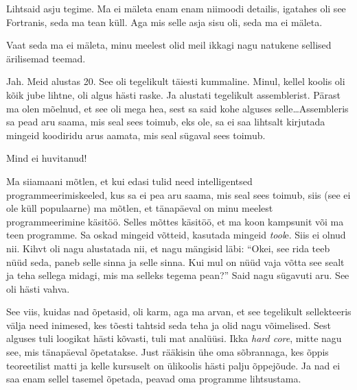 Lihtsaid asju tegime. Ma ei mäleta enam enam niimoodi detailis, igatahes oli see Fortranis, seda ma tean küll. Aga mis selle asja sisu oli, seda ma ei mäleta. 


Vaat seda ma ei mäleta, minu meelest olid meil ikkagi nagu natukene sellised ärilisemad teemad. 


Jah. Meid alustas 20. See oli tegelikult täiesti kummaline. Minul, kellel koolis oli kõik jube lihtne, oli algus hästi raske. Ja alustati tegelikult assemblerist. Pärast ma olen mõelnud, et see oli mega hea, sest sa said kohe alguses selle\ldots Assembleris  sa pead aru saama, mis seal sees toimub, eks ole, sa ei saa lihtsalt kirjutada mingeid koodiridu arus aamata, mis seal sügaval sees toimub. 


Mind ei huvitanud!


Ma siiamaani mõtlen, et kui edasi tulid need intelligentsed programmeerimiskeeled, kus sa ei pea  aru saama, mis seal sees toimub, siis (see ei ole küll populaarne) ma mõtlen, et tänapäeval on minu meelest programmeerimine käsitöö. Selles mõttes käsitöö, et ma koon kampsunit või ma teen programme. Sa oskad mingeid võtteid,  kasutada mingeid \emph{tool}e. Siis ei olnud nii. Kihvt oli nagu alustatada nii, et nagu mängisid läbi: \enquote{Okei, see rida teeb nüüd seda, paneb selle sinna ja selle sinna. Kui mul on nüüd vaja võtta see sealt ja teha sellega midagi, mis ma selleks tegema pean?} Said nagu sügavuti aru. See oli hästi vahva. 

See viis, kuidas nad õpetasid, oli karm, aga ma arvan, et see tegelikult sellekteeris välja need inimesed, kes tõesti tahtsid seda teha ja olid nagu võimelised. Sest  alguses tuli loogikat hästi kõvasti, tuli mat analüüsi. Ikka \emph{hard core}, mitte nagu see, mis tänapäeval õpetatakse. Just rääkisin ühe oma sõbrannaga, kes õppis teoreetilist matti ja kelle kursuselt on ülikoolis hästi palju õppejõude. Ja nad ei saa enam sellel tasemel õpetada, peavad oma programme lihtsustama. 

